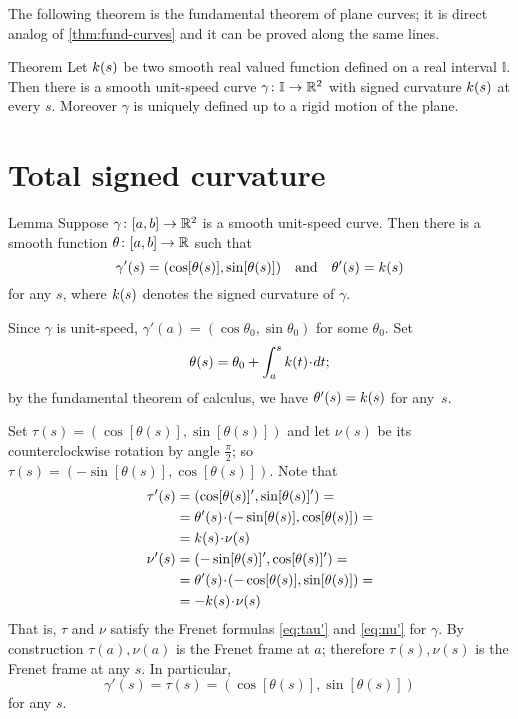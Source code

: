 The following theorem is the fundamental theorem of plane curves; it is direct analog of \ref{thm:fund-curves} and it can be proved along the same lines.

\begin{thm}{Theorem}\label{thm:fund-curves-2D}
Let $k(s)$ be two smooth real valued function defined on a real interval $\mathbb{I}$.
Then there is a smooth unit-speed curve $\gamma\colon\mathbb{I}\to\mathbb{R}^2$ with signed curvature $k(s)$ at every $s$.
Moreover $\gamma$ is uniquely defined up to a rigid motion of the plane.
\end{thm}

\section*{Total signed curvature}

\begin{thm}{Lemma}\label{lem:2D-angle}
Suppose $\gamma\colon[a,b]\to\mathbb{R}^2$ is a smooth unit-speed  curve.
Then there is a smooth function $\theta\colon[a,b]\to\mathbb{R}$ such that 
\[\gamma'(s)=(\cos[\theta(s)],\sin[\theta(s)])\quad\text{and}\quad \theta'(s)=k(s)\]
for any $s$,
where $k(s)$ denotes the signed curvature of $\gamma$.
\end{thm}

Since $\gamma$ is unit-speed, $\gamma'(a)=(\cos\theta_0,\sin\theta_0)$ for some $\theta_0$.
Set 
\[\theta(s)=\theta_0+\int_a^s\skur(t)\cdot dt;\]
by the fundamental theorem of calculus, we have $\theta'(s)=k(s)$ for any~$s$.

Set $\tau(s)=(\cos[\theta(s)],\sin[\theta(s)])$ and let $\nu(s)$ be its counterclockwise rotation by angle $\tfrac\pi2$; so $\tau(s)=(-\sin[\theta(s)],\cos[\theta(s)])$.
Note that
\begin{align*}
\tau'(s)&=(\cos[\theta(s)]',\sin[\theta(s)]')=
\\
&=\theta'(s)\cdot (-\sin[\theta(s)],\cos[\theta(s)])=
\\
&=\skur(s)\cdot \nu(s)
\\
\nu'(s)&=(-\sin[\theta(s)]',\cos[\theta(s)]')=
\\
&=\theta'(s)\cdot (-\cos[\theta(s)],\sin[\theta(s)])=
\\
&=-\skur(s)\cdot \nu(s)
\end{align*}
That is, $\tau$ and $\nu$ satisfy the Frenet formulas \ref{eq:tau'} and \ref{eq:nu'} for $\gamma$.
By construction $\tau(a),\nu(a)$ is the Frenet frame at $a$; therefore $\tau(s),\nu(s)$ is the Frenet frame at any $s$.
In particular, 
\[\gamma'(s)=\tau(s)=(\cos[\theta(s)],\sin[\theta(s)])\]
for any $s$.
\qeds



